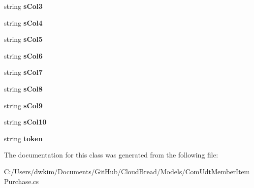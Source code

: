 \begin{DoxyCompactItemize}
\item 
string {\bfseries s\+Col3}\hypertarget{a00073_a056b4317d5a06a7b9299f0e25631c9c0}{}\label{a00073_a056b4317d5a06a7b9299f0e25631c9c0}

\item 
string {\bfseries s\+Col4}\hypertarget{a00073_acbbd805f0a359313f261fad867a9084c}{}\label{a00073_acbbd805f0a359313f261fad867a9084c}

\item 
string {\bfseries s\+Col5}\hypertarget{a00073_a2f90cb8ade6cb4c2987d38bef33027ba}{}\label{a00073_a2f90cb8ade6cb4c2987d38bef33027ba}

\item 
string {\bfseries s\+Col6}\hypertarget{a00073_addc50cd0ac68519dd07abbb15e440116}{}\label{a00073_addc50cd0ac68519dd07abbb15e440116}

\item 
string {\bfseries s\+Col7}\hypertarget{a00073_a44bb698b2432b6df73b2522ebe8addc0}{}\label{a00073_a44bb698b2432b6df73b2522ebe8addc0}

\item 
string {\bfseries s\+Col8}\hypertarget{a00073_a5d17a2b89065237be0b94de178aefd0a}{}\label{a00073_a5d17a2b89065237be0b94de178aefd0a}

\item 
string {\bfseries s\+Col9}\hypertarget{a00073_a7409d85e6fa74b7b2102b70d1a3e1d99}{}\label{a00073_a7409d85e6fa74b7b2102b70d1a3e1d99}

\item 
string {\bfseries s\+Col10}\hypertarget{a00073_a449ee8fc07339f4ec96b8fb1fe0bf4a6}{}\label{a00073_a449ee8fc07339f4ec96b8fb1fe0bf4a6}

\item 
string {\bfseries token}\hypertarget{a00073_a53ff6a1c275d689a107d6ed65289a912}{}\label{a00073_a53ff6a1c275d689a107d6ed65289a912}

\end{DoxyCompactItemize}


The documentation for this class was generated from the following file\+:\begin{DoxyCompactItemize}
\item 
C\+:/\+Users/dwkim/\+Documents/\+Git\+Hub/\+Cloud\+Bread/\+Models/Com\+Udt\+Member\+Item\+Purchase.\+cs\end{DoxyCompactItemize}

